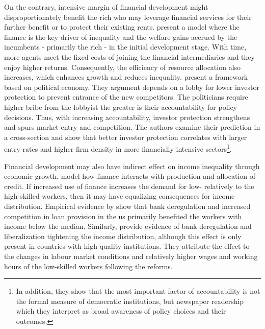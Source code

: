\documentclass[a4paper,11pt]{article}
\begin{document}
On the contrary, intensive margin of financial development might disproportionately benefit the rich who may leverage financial services for their further benefit or to protect their existing rents. \citet{GreenwoodJovanovic1990} present a model where the finance is the key driver of inequality and the welfare gains accrued by the incumbents - primarily the rich - in the initial development stage. With time, more agents meet the fixed costs of joining the financial intermediaries and they enjoy higher returns. Consequently, the efficiency of resource allocation also increases, which enhances growth and reduces inequality. \citet{perotti2007investor} present a framework based on political economy. They argument depends on a lobby for lower investor protection to prevent entrance of the new competitors. The politicians require higher bribe from the lobbyist the greater is their accountability for policy decisions. Thus, with increasing accountability, investor protection strengthens and spurs market entry and competition. The authors examine their prediction in a cross-section and show that better investor protection correlates with larger entry rates and higher firm density in more financially intensive sectors\footnote{In addition, they show that the most important factor of accountability is not the formal measure of democratic institutions, but newspaper readership which they interpret as broad awareness of policy choices and their outcomes.}. 

Financial development may also have indirect effect on income inequality through economic growth. \citet{townsendeueda2006} model how finance interacts with production and allocation of credit. If increased use of finance increases the demand for low- relatively to the high-skilled workers, then it may have equalizing consequences for income distribution. Empirical evidence by \citet{beck2010big} show that bank deregulation and increased competition in loan provision in the \ac{us} primarily benefited the workers with income below the median. Similarly, \citet{delis2014} provide evidence of bank deregulation and liberalization tightening the income distribution, although this effect is only present in countries with high-quality institutions. They attribute the effect to the changes in labour market conditions and relatively higher wages and working hours of the low-skilled workers following the reforms. 
\end{document}

